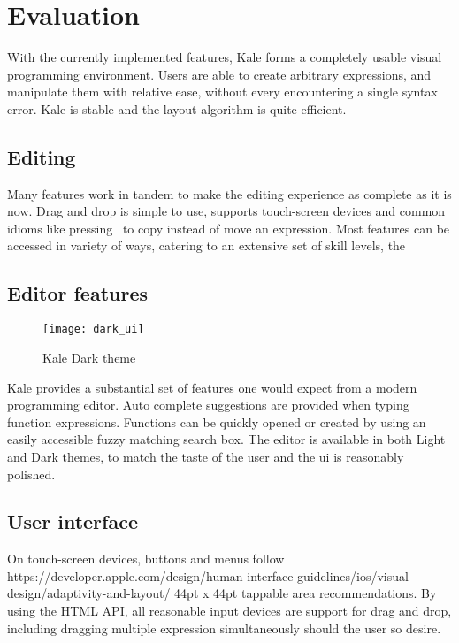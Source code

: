 \chapter{Evaluation}

With the currently implemented features, Kale forms a completely
usable visual programming environment. Users are able to create
arbitrary expressions, and manipulate them with relative ease, without
every encountering a single syntax error. Kale is stable and the layout
algorithm is quite efficient.

\section{Editing}
Many features work in tandem to make the editing experience as complete as it
is now. Drag and drop is simple to use, supports touch-screen devices and
common idioms like pressing~\keys{\ctrl} to copy instead of move an expression.
Most features can be accessed in variety of ways, catering to an extensive
set of skill levels, the 


\section{Editor features}
\begin{wrapfigure}[11]{r}{8cm}
\texttt{[image: dark\_ui]}	
\caption{Kale Dark theme}
\end{wrapfigure}

Kale provides a substantial set of features one would expect from a modern
programming editor. Auto complete suggestions are provided when typing
function expressions. Functions can be quickly opened or created by using an
easily accessible fuzzy matching search box. The editor is available in both
Light and Dark themes, to match the taste of the user and the \ac{ui} is
reasonably polished.

\section{User interface}
On touch-screen devices, buttons and menus follow
{https://developer.apple.com/design/human-interface-guidelines/ios/visual-design/adaptivity-and-layout/}
44pt x 44pt tappable area recommendations. By using the HTML
 API,
all reasonable input devices are support for drag and drop, including dragging
multiple expression simultaneously should the user so desire.

